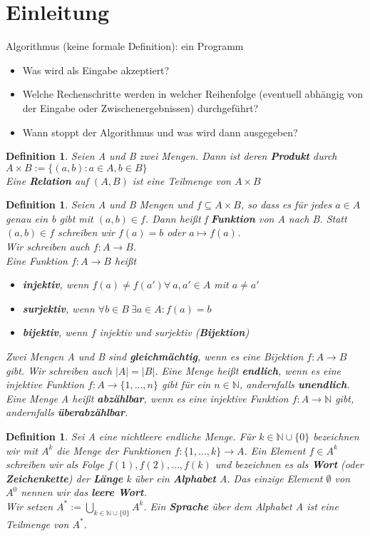 \documentclass[12pt,a4paper]{article}
\theoremstyle{plain}
\newtheorem{Definition}[Theorem]{Definition}
\newcommand{\herv}[1]{{\emph{\textbf{#1}}}}
\newcommand{\N}{\mathbb{N}}
\numberwithin{equation}{section}
\begin{document}
\section{Einleitung}
Algorithmus (keine formale Definition): \glqq ein Programm \grqq \begin{itemize}
\item Was wird als Eingabe akzeptiert?
\item Welche Rechenschritte werden in welcher Reihenfolge (eventuell abhängig von der Eingabe oder Zwischenergebnissen) durchgeführt?
\item Wann stoppt der Algorithmus und was wird dann ausgegeben?
\end{itemize}
\begin{Definition}
Seien A und B zwei Mengen. Dann ist deren \herv{Produkt} durch \\
$A\times B := \{(a,b): a \in A, b\in B \}$ \\
Eine \herv{Relation} auf $(A,B)$ ist eine Teilmenge von $A\times B $
\end{Definition}
\begin{Definition}
Seien A und B Mengen und $f\subseteq A\times B$, so dass es für jedes $a \in A$ genau ein b gibt mit $(a,b)\in f$. Dann heißt f \herv{Funktion} von A nach B. Statt $(a,b) \in f$ schreiben wir $f(a)=b$ oder $a \mapsto f(a)$. \\
Wir schreiben auch $f: A \rightarrow B$.\\
Eine Funktion $f: A\rightarrow B$ heißt 
\begin{itemize}
\item \herv{injektiv}, wenn $f(a)\neq f(a') \forall\ a,a'\in A$ mit $a\neq a'$
\item \herv{surjektiv}, wenn $\forall b\in B\  \exists a \in A: f(a)=b$
\item \herv{bijektiv}, wenn $f$ injektiv und surjektiv (\herv{Bijektion})
\end{itemize}
Zwei Mengen A und B sind \herv{gleichmächtig}, wenn es eine Bijektion $f: A\rightarrow B$ gibt. Wir schreiben auch $|A|=|B|$. Eine Menge heißt \herv{endlich}, wenn es eine injektive Funktion $f:A \rightarrow \{1,\ldots,n\}$ gibt für ein $n \in \mathbb{N}$, andernfalls \herv{unendlich}. Eine Menge A heißt \herv{abzählbar}, wenn es eine injektive Funktion $f:A\rightarrow \N$ gibt, andernfalls \herv{überabzählbar}.
\end{Definition}
\begin{Definition}
Sei A eine nichtleere endliche Menge. Für $k\in \mathbb{N}\cup\{0\}$ bezeichnen wir mit $A^k$ die Menge der Funktionen $f:\{1,\ldots,k\}\rightarrow A$. Ein Element $f\in A^k$ schreiben wir als Folge $f(1),f(2),\ldots,f(k)$ und bezeichnen es als \herv{Wort} (oder \herv{Zeichenkette}) der \herv{Länge} k über ein \herv{Alphabet} A. Das einzige Element $\emptyset$ von $A^0$ nennen wir das \herv{leere Wort}. \\
Wir setzen $A^*:=\bigcup_{k\in \mathbb{N}\cup\{0\}} A^k$. Ein \herv{Sprache} über dem Alphabet A ist eine Teilmenge von $A^*$.
\end{Definition}
\end{document}

